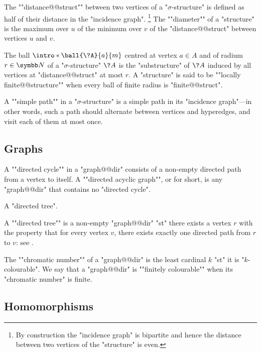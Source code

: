 The \AP""distance@@struct"" between two vertices of a "$\sigma$-structure"
is defined as half of their distance in the "incidence graph".%
\footnote{By construction the "incidence graph" is bipartite and hence
the distance between two vertices of the "structure" is even.}
The \AP""diameter"" of a "structure" is the maximum over $u$
of the minimum over $v$ of the "distance@@struct" between vertices $u$ and $v$.

The ball \AP$\intro*\ball{\?A}{a}{m}$ centred at vertex $a\in A$ and of radium $r\in\N$ of
a "$\sigma$-structure" $\?A$ is the "substructure" of $\?A$ induced by
all vertices at "distance@@struct" at most $r$.
A "structure" is said to be \AP""locally finite@@structure""
when every ball of finite radius is "finite@@struct".

A \AP""simple path"" in a "$\sigma$-structure" is a
simple path in its "incidence graph"---in other words, 
such a path should alternate between vertices and hyperedges,
and visit each of them at most once.

\subsection{Graphs}

A \AP""directed cycle"" in a "graph@@dir" consists
of a non-empty directed path from a vertex to itself.
A ""directed acyclic graph"", or  for short,
is any "graph@@dir" that contains no "directed cycle".

\begin{marginfigure}
	\centering
	\begin{tikzpicture}
		
	\end{tikzpicture}
	\caption{\AP \label{fig:general-prelim-directed-tree} A "directed tree".}
\end{marginfigure}
A ""directed tree"" is a non-empty "graph@@dir" "st" there exists 
a vertex $r$ with the property that for every vertex $v$,
there exists exactly one directed path from $r$ to $v$:
see .

The ""chromatic number"" of a "graph@@dir" is the least cardinal $k$
"st" it is "$k$-colourable". We say that a "graph@@dir"
is \AP""finitely colourable"" when its "chromatic number" is finite.


\subsection{Homomorphisms}

